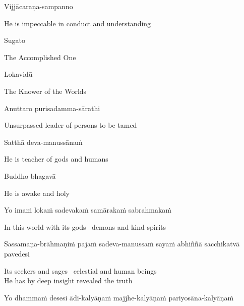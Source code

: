 Vijjācaraṇa-sampanno

\begin{english}
  He is impeccable in conduct and understanding
\end{english}

Sugato

\begin{english}
  The Accomplished One
\end{english}

Lokavidū

\begin{english}
  The Knower of the Worlds
\end{english}

Anuttaro purisadamma-sārathi

\begin{english}
  Unsurpassed leader of persons to be tamed\hyperlink{endnote3-appendix}{\hypertarget{endnote3-body}{}}
\end{english}

Satthā deva-manussānaṁ

\begin{english}
  He is teacher of gods and humans
\end{english}

Buddho bhagavā

\begin{english}
  He is awake and holy
\end{english}

Yo imaṁ lokaṁ sadevakaṁ samārakaṁ sabrahmakaṁ

\begin{english}
  In this world with its gods \breathmark\ demons and kind spirits
\end{english}

\begin{pali-hang}
  Sassamaṇa-brāhmaṇiṁ pajaṁ sadeva-manussaṁ sayaṁ abhiññā sacchikatvā pavedesi
\end{pali-hang}

\begin{english}
  Its seekers and sages \breathmark\ celestial and human beings\\
  He has by deep insight revealed the truth
\end{english}

\begin{pali-hang}
  Yo dhammaṁ desesi ādi-kalyāṇaṁ majjhe-kalyāṇaṁ pariyosāna-kalyāṇaṁ
\end{pali-hang}

